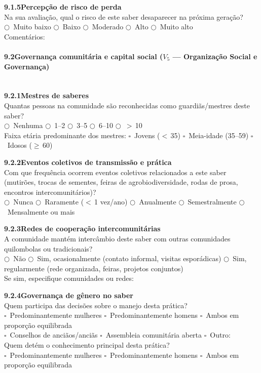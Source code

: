 \medskip\noindent\textbf{9.1.5\quad Percepção de risco de perda}\\[2pt]
Na sua avaliação, qual o risco de este saber desaparecer na próxima geração?\\
$\bigcirc$~Muito baixo \quad $\bigcirc$~Baixo \quad $\bigcirc$~Moderado \quad $\bigcirc$~Alto \quad $\bigcirc$~Muito alto\\[2pt]
Comentários: \dotfill

\paragraph{9.2\quad Governança comunitária e capital social ($V_5$ --- Organização Social e Governança)}~\\[4pt]

\noindent\textbf{9.2.1\quad Mestres de saberes}\\[2pt]
Quantas pessoas na comunidade são reconhecidas como guardiãs/mestres deste saber?\\
$\bigcirc$~Nenhuma \quad $\bigcirc$~1--2 \quad $\bigcirc$~3--5 \quad $\bigcirc$~6--10 \quad $\bigcirc$~$>$\,10\\[2pt]
Faixa etária predominante dos mestres: $\square$~Jovens ($<$\,35) \quad $\square$~Meia-idade (35--59) \quad $\square$~Idosos ($\geq$\,60)

\medskip\noindent\textbf{9.2.2\quad Eventos coletivos de transmissão e prática}\\[2pt]
Com que frequência ocorrem eventos coletivos relacionados a este saber (mutirões, trocas de sementes, feiras de agrobiodiversidade, rodas de prosa, encontros intercomunitários)?\\
$\bigcirc$~Nunca \quad $\bigcirc$~Raramente ($<$\,1 vez/ano) \quad $\bigcirc$~Anualmente \quad $\bigcirc$~Semestralmente \quad $\bigcirc$~Mensalmente ou mais

\medskip\noindent\textbf{9.2.3\quad Redes de cooperação intercomunitárias}\\[2pt]
A comunidade mantém intercâmbio deste saber com outras comunidades quilombolas ou tradicionais?\\
$\bigcirc$~Não \quad $\bigcirc$~Sim, ocasionalmente (contato informal, visitas esporádicas) \quad $\bigcirc$~Sim, regularmente (rede organizada, feiras, projetos conjuntos)\\[2pt]
Se sim, especifique comunidades ou redes: \dotfill

\medskip\noindent\textbf{9.2.4\quad Governança de gênero no saber}\\[2pt]
Quem participa das decisões sobre o manejo desta prática?\\
$\square$~Predominantemente mulheres \quad $\square$~Predominantemente homens \quad $\square$~Ambos em proporção equilibrada\\
$\square$~Conselhos de anciãos/anciãs \quad $\square$~Assembleia comunitária aberta \quad $\square$~Outro: \dotfill\\[4pt]
Quem detém o conhecimento principal desta prática?\\
$\square$~Predominantemente mulheres \quad $\square$~Predominantemente homens \quad $\square$~Ambos em proporção equilibrada

